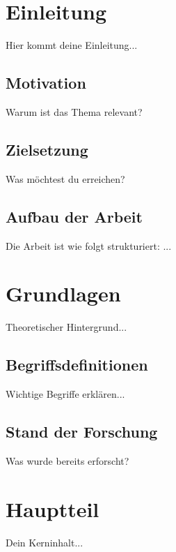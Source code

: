 \documentclass[12pt,a4paper]{article}
\begin{document}



\tableofcontents
\newpage





\section{Einleitung}
Hier kommt deine Einleitung...

\subsection{Motivation}
Warum ist das Thema relevant?

\subsection{Zielsetzung}
Was möchtest du erreichen?

\subsection{Aufbau der Arbeit}
Die Arbeit ist wie folgt strukturiert: ...


\section{Grundlagen}
Theoretischer Hintergrund...

\subsection{Begriffsdefinitionen}
Wichtige Begriffe erklären...

\subsection{Stand der Forschung}
Was wurde bereits erforscht? \cite{beispielquelle}


\section{Hauptteil}
Dein Kerninhalt...
\end{document}

